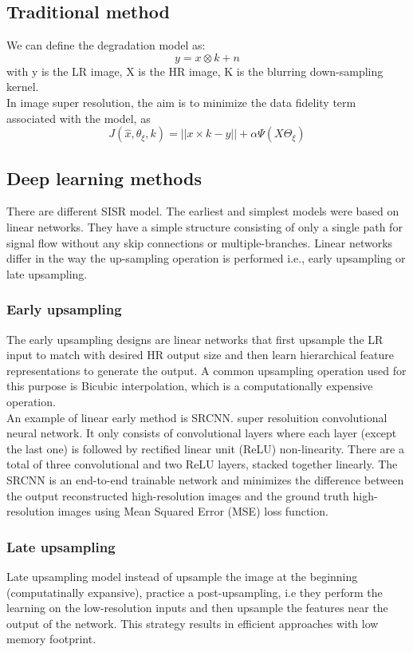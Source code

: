\documentclass[a4paper, 10pt]{book}
\begin{document}
\subsection{Traditional method}
We can define the degradation model as:
\begin{equation}
    \label{first SR}
    y = {x \otimes k } + n 
\end{equation}
with y is the LR image, X  is the HR image, K is the blurring down-sampling kernel.
\\
In image super resolution, the aim is to minimize the data fidelity term associated with the model, as
\begin{equation}
    \label{fidelty equation}
    J(\hat{x} , \theta _\xi , k ) = ||{x \times k - y}|| +  \alpha \Psi(X\Theta_\xi) 
\end{equation}
\subsection{Deep learning methods} 
There are different SISR model. The earliest and simplest  models were based on linear networks.
They have a simple structure consisting of only
a single path for signal flow without any skip connections
or multiple-branches.
Linear networks differ in the way the up-sampling operation is performed i.e., early upsampling or late upsampling.
\subsubsection{ Early upsampling}
The early upsampling designs are linear networks that first
upsample the LR input to match with desired HR output size and then learn hierarchical feature representations to
generate the output. 
A common upsampling operation used for this purpose is Bicubic interpolation, which is a computationally expensive operation. 
\\ 
An example of linear early method is SRCNN. super resoluition convolutional neural network.
It only consists of convolutional layers where each layer (except the last one) is followed by rectified linear unit (ReLU) non-linearity. There are a total of three convolutional and two ReLU layers, stacked together
linearly. The SRCNN is an end-to-end trainable network and minimizes the difference between the output reconstructed high-resolution images and the ground truth high-resolution images using Mean Squared Error (MSE) loss function.
\subsubsection{Late upsampling}
Late upsampling model instead of upsample the image at the beginning (computatinally expansive), practice a post-upsampling, i.e they perform the learning on the low-resolution inputs and then upsample the features near the output of the network.
This strategy results in efficient approaches with low memory footprint. 
\end{document}
